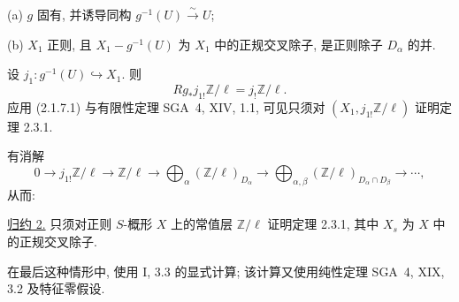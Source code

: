 \medskip
\noindent(a) $g$ 固有, 并诱导同构 $g^{-1}(U)\xrightarrow{\sim}U$;

\noindent(b) $X_1$ 正则, 且 $X_1-g^{-1}(U)$ 为 $X_1$ 中的正规交叉除子, 是正则除子 $D_\alpha$ 的并.

设 $j_1:g^{-1}(U)\hookrightarrow X_1$. 则
\[
Rg_*j_{1!}\mathbb Z/\ell=j_!\mathbb Z/\ell.
\]
应用 (2.1.7.1) 与有限性定理 SGA~4, XIV, 1.1, 可见只须对 $(X_1,j_{1!}\mathbb Z/\ell)$ 证明定理 2.3.1.

有消解
\[
0\longrightarrow j_{1!}\mathbb Z/\ell
\longrightarrow\mathbb Z/\ell
\longrightarrow\bigoplus_\alpha(\mathbb Z/\ell)_{D_\alpha}
\longrightarrow
\bigoplus_{\alpha,\beta}
(\mathbb Z/\ell)_{D_\alpha\cap D_\beta}
\longrightarrow\cdots,
\]
从而:

\medskip
\noindent\underline{归约 2.}
只须对正则 $S$-概形 $X$ 上的常值层 $\mathbb Z/\ell$ 证明定理 2.3.1, 其中 $X_s$ 为 $X$ 中的正规交叉除子.

在最后这种情形中, 使用 I, 3.3 的显式计算; 该计算又使用纯性定理 SGA~4, XIX, 3.2 及特征零假设.
